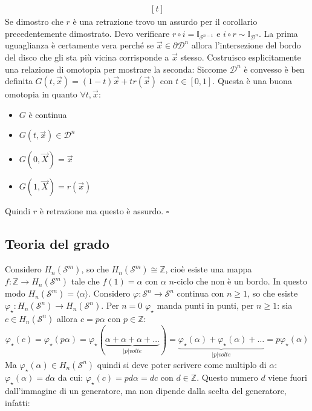 \documentclass[10pt, twoside=false, x11names]{scrbook}
\newenvironment{proof}{{\textbf{Dimostrazione}:}}{\hfill $\square$}
\newcommand{\Z}{\mathbb{Z}}
\renewcommand{\phi}{\varphi}
\newcommand{\Id}[1][]{\mathbb{I}_#1}
\newcommand{\Sph}[1][]{\mathcal{S}^#1}
\newcommand{\Disk}[1][]{\mathcal{D}^#1}
\begin{document}
\begin{proof}
\[\begin{aligned}[t]
    \end{aligned}
  \]
  Se dimostro che $ r $ è una retrazione trovo un assurdo per il corollario
  precedentemente dimostrato.
  Devo verificare $ r \circ i = \Id{\Sph{n-1}} $ e $ i \circ r \sim \Id{\Disk{n}} $.
  La prima uguaglianza è certamente vera perché se $ \vec{x} \in \partial \Disk{n} $
  allora l'intersezione del bordo del disco che gli sta più vicina corrisponde a
  $ \vec{x} $ stesso.
  Costruisco esplicitamente una relazione di omotopia per mostrare la seconda:
  Siccome $ \Disk{n} $ è convesso è ben definita $ G(t, \vec{x}) = (1-t)\vec{x}
  + t r(\vec{x}) $ con $ t \in [0,1] $. Questa è una buona omotopia in quanto $ \forall t, \vec{x} $:
  \begin{itemize}
    \item $ G $ è continua
    \item $ G(t, \vec{x}) \in \Disk{n} $
    \item $ G(0, \vec{X}) = \vec{x} $
    \item $ G(1, \vec{X}) = r(\vec{x}) $
  \end{itemize}
  Quindi $ r $ è retrazione ma questo è assurdo.
\end{proof}

\subsection{Teoria del grado}

Considero $ H_n(\Sph{m}) $, so che $ H_n(\Sph{m}) \cong \Z $, cioè esiste una mappa
$ f \colon \Z \to H_n(\Sph{m}) $ tale che $ f(1) = \alpha $ con $ \alpha $ $ n $-ciclo
che non è un bordo. In questo modo $ H_n(\Sph{m}) = \langle\alpha\rangle $.
Considero $ \phi \colon \Sph{n} \to \Sph{n} $ continua con $ n \geq 1 $, so che esiste
$ \phi_\star \colon H_n(\Sph{n}) \to H_n(\Sph{n}) $. Per $ n = 0 $ $ \phi_\star $ manda punti
in punti, per $ n \geq 1 $: sia $ c \in H_n(\Sph{n}) $ allora $ c = p \alpha $ con $ p \in \Z $:
\[
  \phi_\star (c) = \phi_\star (p \alpha) = \phi_\star (\underbrace{\alpha + \alpha + \alpha + \dots}_{|p| volte}) =
  \underbrace{\phi_\star (\alpha) + \phi_\star (\alpha) + \dots}_{|p| volte} = p \phi_\star(\alpha)
\]
Ma $ \phi_\star(\alpha) \in H_n(\Sph{n}) $ quindi si deve poter scrivere come multiplo di $ \alpha $:
$ \phi_\star (\alpha) = d \alpha $ da cui: $ \phi_\star (c) = p d \alpha = d c $ con $ d \in \Z $.
Questo numero $ d $ viene fuori dall'immagine di un generatore, ma non dipende dalla
scelta del generatore, infatti:
\end{document}
